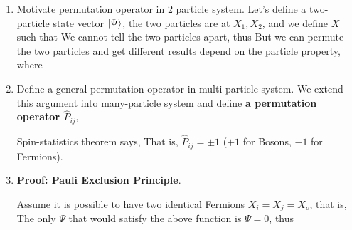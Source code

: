 \documentclass{school-22.101-notes}
\begin{document}
\clearpage
{}
\begin{enumerate}
\item Motivate permutation operator in 2 particle system. Let's define a two-particle state vector $\left| \Psi \right>$, the two particles are at $X_1, X_2$, and we define $X$ such that 
We cannot tell the two particles apart, thus 
But we can permute the two particles and get different results depend on the particle property, 
where

\item Define a general permutation operator in multi-particle system. 
We extend this argument into many-particle system and define \textbf{a permutation operator $\hat{P}_{ij}$}, 

Spin-statistics theorem says, 
That is, $\hat{P}_{ij} = \pm 1$ ($+1$ for Bosons, $-1$ for Fermions). 


\item \textbf{Proof: Pauli Exclusion Principle}. 

Assume it is possible to have two identical Fermions $X_i = X_j = X_o$, that is, 
The only $\Psi$ that would satisfy the above function is $\Psi = 0$, thus  
\end{enumerate}
\end{document}
